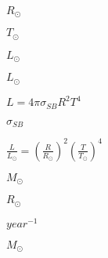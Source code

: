 \documentclass{article}
\begin{document}
$ R_{\odot} $
\pagebreak

$ T_{\odot} $
\pagebreak

$ L_{\odot}$
\pagebreak

$ L_{\odot} $
\pagebreak

$ L = 4\pi\sigma_{SB}R^2T^4 $
\pagebreak

$ \sigma_{SB} $
\pagebreak

$ \frac{L}{L_{\odot}} = \left( \frac{R}{R_{\odot}} \right)^2 \left( \frac{T}{T_{\odot}} \right)^4 $
\pagebreak

$ M_{\odot}$
\pagebreak

$ R_{\odot}$
\pagebreak

$ year^{-1} $
\pagebreak

$ M_{\odot} $
\pagebreak
\end{document}
